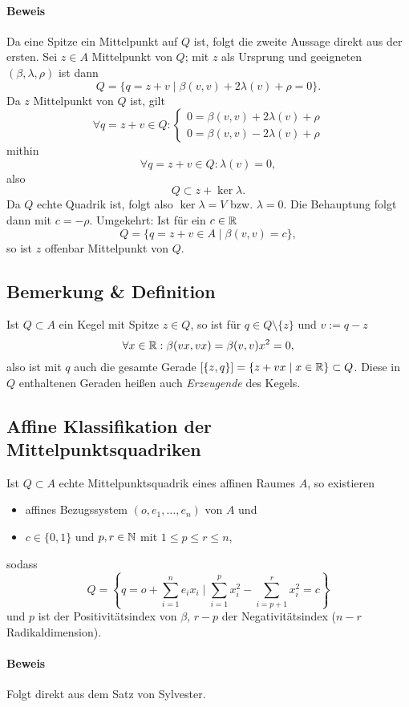 \paragraph{Beweis}
	Da eine Spitze ein Mittelpunkt auf $ Q $ ist, folgt die zweite Aussage direkt aus der ersten.
	Sei $ z\in A $ Mittelpunkt von $ Q $; mit $ z $ als Ursprung und geeigneten $ (\beta,\lambda,\rho) $ ist dann
		\[ Q=\{q=z+v\mid \beta(v,v)+2\lambda(v)+\rho = 0\}. \]
	Da $ z $ Mittelpunkt von $ Q $ ist, gilt
		\[ \forall q=z+v\in Q: \begin{cases}
		0 = \beta(v,v)+2\lambda(v)+\rho\\
		0 = \beta(v,v)-2\lambda(v)+\rho
		\end{cases} \]
	mithin
		\[ \forall q=z+v\in Q: \lambda(v) = 0, \]
	also 
		\[ Q\subset z +\ker \lambda. \]
	Da $ Q $ echte Quadrik ist, folgt also $ \ker \lambda = V $ bzw. $ \lambda = 0 $. Die Behauptung folgt dann mit $ c=-\rho $. Umgekehrt: Ist für ein $ c\in \mathbb{R} $
		\[ Q=\{q=z+v\in A\mid \beta(v,v)=c \}, \]
	so ist $ z $ offenbar Mittelpunkt von $ Q $.
\subsection{Bemerkung \& Definition}
	Ist $ Q\subset A $ ein Kegel mit Spitze $ z\in Q $, so ist für $ q\in Q\setminus\{z\} $ und $ v:= q-z $
		\[ \forall x\in \mathbb{R}: \beta(vx,vx)= \beta(v,v)x^2 = 0,  \]
	also ist mit $ q $ auch die gesamte Gerade $ [\{z,q\}] = \{z+vx\mid x\in \mathbb{R}\}\subset Q $. Diese in $ Q $ enthaltenen Geraden heißen auch \emph{Erzeugende} des Kegels.
\subsection{Affine Klassifikation der Mittelpunktsquadriken}
	Ist $ Q\subset A $ echte Mittelpunktsquadrik eines affinen Raumes $ A $, so existieren
	\begin{itemize}
		\item affines Bezugssystem $ (o,e_1,\dots,e_n) $ von $ A $ und
		\item $ c\in \{0,1\} $ und $ p,r\in \mathbb{N} $ mit $ 1\leq p\leq r \leq n $, 
	\end{itemize}
	sodass 
		\[ Q=\left\{q=o+\sum_{i=1}^{n}e_ix_i\mid \sum_{i=1}^{p}x_i^2-\sum_{i=p+1}^{r}x_i^2 = c \right\} \]
	und $ p $ ist der Positivitätsindex von $ \beta $, $ r-p $ der Negativitätsindex ($ n-r $ Radikaldimension). 
\paragraph{Beweis}
	Folgt direkt aus dem Satz von Sylvester.
